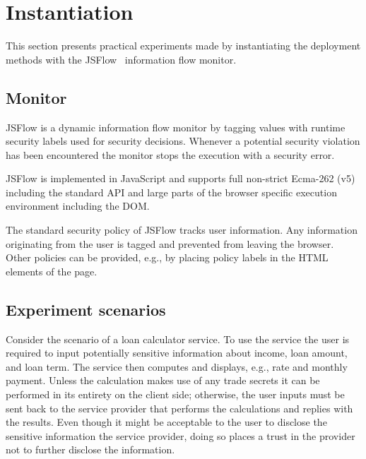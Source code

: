 \documentclass{llncs}
\begin{document}

\section{Instantiation}
\label{sec:case}

This section presents practical experiments made by instantiating the deployment
methods with the JSFlow~\cite{} information flow monitor. 

\subsection{Monitor}

JSFlow is a dynamic information flow monitor by tagging values with runtime
security labels used for security decisions. Whenever a potential security
violation has been encountered the monitor stops the execution with a security
error. 

JSFlow is implemented in JavaScript and supports full non-strict Ecma-262 (v5)
including the standard API and large parts of the browser specific execution
environment including the DOM.

The standard security policy of JSFlow tracks user information.  Any
information originating from the user is tagged and prevented from leaving the
browser. Other policies can be provided, e.g., by placing policy labels in the
HTML elements of the page. 


\subsection{Experiment scenarios}

Consider the scenario of a loan calculator service. To use the service the
user is required to input potentially sensitive information about income, 
loan amount, and loan term. The service then computes and displays, e.g., 
rate and monthly payment. Unless the calculation makes use of any trade secrets
it can be performed in its entirety on the client side; otherwise, the
user inputs must be sent back to the service provider that performs the
calculations and replies with the results. Even though it might be acceptable to 
the user to disclose the sensitive information the service provider,
doing so places a trust in the provider not to further disclose the information.
\end{document}
